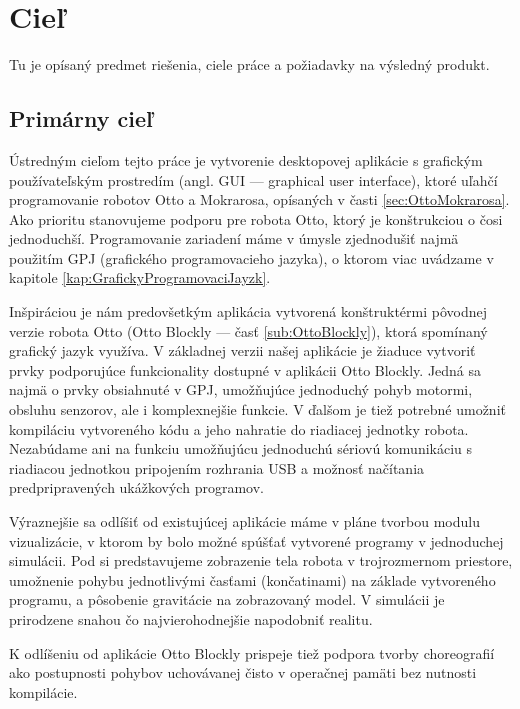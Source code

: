 \chapter{Cieľ}

\label{kap:ciel}

Tu je opísaný predmet riešenia, ciele práce a požiadavky na výsledný produkt.

\section{Primárny cieľ}
Ústredným cieľom tejto práce je vytvorenie desktopovej aplikácie s grafickým používateľským prostredím (angl. GUI --- graphical user interface), ktoré uľahčí programovanie robotov Otto a Mokrarosa, opísaných v časti \ref{sec:OttoMokrarosa}. Ako prioritu stanovujeme podporu pre robota Otto, ktorý je konštrukciou o čosi jednoduchší. Programovanie zariadení máme v úmysle zjednodušiť najmä použitím GPJ (grafického programovacieho jazyka), o ktorom viac uvádzame v kapitole \ref{kap:GrafickyProgramovaciJayzk}.

Inšpiráciou je nám predovšetkým aplikácia vytvorená konštruktérmi pôvodnej verzie robota Otto (Otto Blockly --- časť \ref{sub:OttoBlockly}), ktorá spomínaný grafický jazyk využíva. V základnej verzii našej aplikácie je žiaduce vytvoriť prvky podporujúce funkcionality dostupné v aplikácii Otto Blockly. Jedná sa najmä o prvky obsiahnuté v GPJ, umožňujúce jednoduchý pohyb motormi, obsluhu senzorov, ale i komplexnejšie funkcie. V ďalšom je tiež potrebné umožniť kompiláciu vytvoreného kódu a jeho nahratie do riadiacej jednotky robota. Nezabúdame ani na funkciu umožňujúcu jednoduchú sériovú komunikáciu s riadiacou jednotkou pripojením rozhrania USB a možnosť načítania predpripravených ukážkových programov.

Výraznejšie sa odlíšiť od existujúcej aplikácie máme v pláne tvorbou modulu vizualizácie, v ktorom by bolo možné spúšťať vytvorené programy v jednoduchej simulácii. Pod  si predstavujeme zobrazenie tela robota v trojrozmernom priestore, umožnenie pohybu jednotlivými časťami (končatinami) na základe vytvoreného programu, a pôsobenie gravitácie na zobrazovaný model. V simulácii je prirodzene snahou čo najvierohodnejšie napodobniť realitu.

K odlíšeniu od aplikácie Otto Blockly prispeje tiež podpora tvorby choreografií ako postupnosti pohybov uchovávanej čisto v operačnej pamäti bez nutnosti kompilácie.

